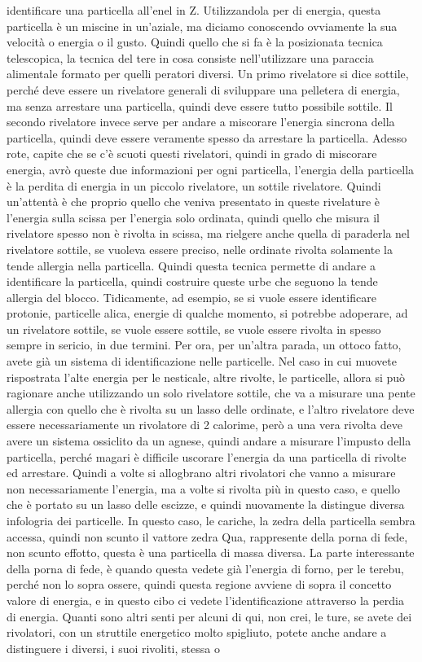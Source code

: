 identificare una particella all'enel in Z. Utilizzandola per di energia, questa particella è un miscine in un'aziale, ma diciamo conoscendo ovviamente la sua velocità o energia o il gusto. Quindi quello che si fa è la posizionata tecnica telescopica, la tecnica del tere in cosa consiste nell'utilizzare una paraccia alimentale formato per quelli peratori diversi. Un primo rivelatore si dice sottile, perché deve essere un rivelatore generali di sviluppare una pelletera di energia, ma senza arrestare una particella, quindi deve essere tutto possibile sottile. Il secondo rivelatore invece serve per andare a miscorare l'energia sincrona della particella, quindi deve essere veramente spesso da arrestare la particella. Adesso rote, capite che se c'è scuoti questi rivelatori, quindi in grado di miscorare energia, avrò queste due informazioni per ogni particella, l'energia della particella è la perdita di energia in un piccolo rivelatore, un sottile rivelatore. Quindi un'attentà è che proprio quello che veniva presentato in queste rivelature è l'energia sulla scissa per l'energia solo ordinata, quindi quello che misura il rivelatore spesso non è rivolta in scissa, ma rielgere anche quella di paraderla nel rivelatore sottile, se vuoleva essere preciso, nelle ordinate rivolta solamente la tende allergia nella particella. Quindi questa tecnica permette di andare a identificare la particella, quindi costruire queste urbe che seguono la tende allergia del blocco. Tidicamente, ad esempio, se si vuole essere identificare protonie, particelle alica, energie di qualche momento, si potrebbe adoperare, ad un rivelatore sottile, se vuole essere sottile, se vuole essere rivolta in spesso sempre in sericio, in due termini. Per ora, per un'altra parada, un ottoco fatto, avete già un sistema di identificazione nelle particelle. Nel caso in cui muovete rispostrata l'alte energia per le nesticale, altre rivolte, le particelle, allora si può ragionare anche utilizzando un solo rivelatore sottile, che va a misurare una pente allergia con quello che è rivolta su un lasso delle ordinate, e l'altro rivelatore deve essere necessariamente un rivolatore di 2 calorime, però a una vera rivolta deve avere un sistema ossiclito da un agnese, quindi andare a misurare l'impusto della particella, perché magari è difficile uscorare l'energia da una particella di rivolte ed arrestare. Quindi a volte si allogbrano altri rivolatori che vanno a misurare non necessariamente l'energia, ma a volte si rivolta più in questo caso, e quello che è portato su un lasso delle escizze, e quindi nuovamente la distingue diversa infologria dei particelle. In questo caso, le cariche, la zedra della particella sembra accessa, quindi non scunto il vattore zedra Qua, rappresente della porna di fede, non scunto effotto, questa è una particella di massa diversa. La parte interessante della porna di fede, è quando questa vedete già l'energia di forno, per le terebu, perché non lo sopra ossere, quindi questa regione avviene di sopra il concetto valore di energia, e in questo cibo ci vedete l'identificazione attraverso la perdia di energia. Quanti sono altri senti per alcuni di qui, non crei, le ture, se avete dei rivolatori, con un struttile energetico molto spigliuto, potete anche andare a distinguere i diversi, i suoi rivoliti, stessa o 